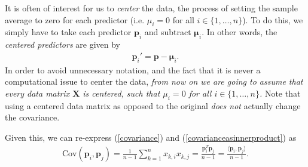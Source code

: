 \documentclass[10pt]{article}
\newcommand{\mydef}[1]{\textcolor{SteelBlue3}{\textit{#1}}} %
\begin{document}
It is often of interest for us to \mydef{center} the data, the process of setting the sample average to zero for each predictor (i.e. $\mu_i = 0$ for all $i \in \{ 1,\ldots,n \}$). To do this, we simply have to take each predictor $\mathbf{p}_{i}$ and subtract $\bm{\mu}_i$. In other words, the \mydef{centered predictors} are given by 
\begin{align}
    \label{centeredpredictors}
    \mathbf{p}_i' = \mathbf{p} - \bm{\mu}_i.
\end{align}
In order to avoid unnecessary notation, and the fact that it is never a computational issue to center the data, \textit{from now on we are going to assume that every data matrix $\mathbf{X}$ is centered, such that $\mu_i = 0$ for all $i \in \{ 1,\ldots,n \}$.} Note that using a centered data matrix as opposed to the original \textit{does not} actually change the covariance.

Given this, we can re-express (\ref{covariance}) and (\ref{covarianceasinnerproduct}) as 
\begin{align}
    \label{covariancecentered}
    \mathrm{Cov}(\mathbf{p}_i, \mathbf{p}_j) = \frac{1}{n-1} \sum_{k=1}^n x_{k,i}x_{k,j} =  \frac{\mathbf{p}_i^T\mathbf{p}_j}{n-1} = \frac{\langle \mathbf{p}_i, \mathbf{p}_j \rangle}{n-1}.
\end{align}
\end{document}
